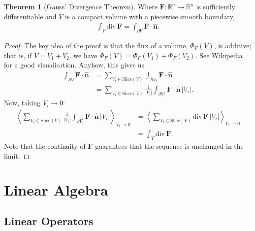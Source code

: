 \documentclass{article}
\theoremstyle{definition}
\newtheorem{thm}{Theorem}[subsubsection]
\begin{document}
\begin{thm}[Gauss' Divergence Theorem]
	Where $\mathbf{F}:\mathbb{R}^n\rightarrow\mathbb{R}^n$ is sufficiently differentiable and $V$ is a compact volume with a piecewise smooth boundary,
	\begin{align*}
		\int_V\text{div}\,\mathbf{F}=\int_{\partial V}\mathbf{F}\cdot\hat{\mathbf{n}}.
	\end{align*}
\end{thm}
\begin{proof}
	The key idea of the proof is that the flux of a volume, $\Phi_F(V)$, is additive; that is, if $V=V_1+V_2$, we have $\Phi_F(V)=\Phi_F(V_1)+\Phi_F(V_2)$. See Wikipedia for a good visualisation.
	Anyhow, this gives us
	\begin{align*}
		\int_{\partial V}\mathbf{F}\cdot\hat{\mathbf{n}}&=\sum_{V_i\in\text{Slice}(V)}\int_{\partial V_i}\mathbf{F}\cdot\hat{\mathbf{n}}\\
		&=\sum_{V_i\in\text{Slice}(V)}\frac{1}{\lvert V_i\rvert}\int_{\partial V_i}\mathbf{F}\cdot\hat{\mathbf{n}}\,\lvert V_i\rvert.
	\end{align*}
	Now, taking $V_i\rightarrow0$:
	\begin{align*}
		\left\langle\sum_{V_i\in\text{Slice}(V)}\frac{1}{\lvert V_i\rvert}\int_{\partial V_i}\mathbf{F}\cdot\hat{\mathbf{n}}\,\lvert V_i\rvert\right\rangle_{V_i\rightarrow0}&=\left\langle\sum_{V_i\in\text{Slice}(V)}\text{div}\,\mathbf{F}\,\lvert V_i\rvert\right\rangle_{V_i\rightarrow0}\\
		&=\int_V\text{div}\,\mathbf{F}.
	\end{align*}
	Note that the continuity of $\mathbf{F}$ guarantees that the sequence is unchanged in the limit.
\end{proof}

\newpage
\section{Linear Algebra}
\subsection{Linear Operators}
\end{document}
